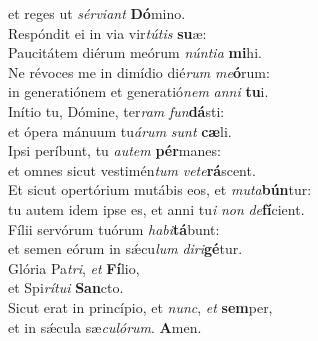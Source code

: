 \oddverse et reges ut \textit{sér}\textit{vi}\textit{ant} \textbf{Dó}mino.\\
\evenverse Respóndit ei in via vir\textit{tú}\textit{tis} \textbf{su}æ:~\*\\
\evenverse Paucitátem diérum meórum \textit{nún}\textit{ti}\textit{a} \textbf{mi}hi.\\
\oddverse Ne révoces me in dimídio dié\textit{rum} \textit{me}\textbf{ó}rum:~\*\\
\oddverse in generatiónem et generatió\textit{nem} \textit{an}\textit{ni} \textbf{tu}i.\\
\evenverse Inítio tu, Dómine, ter\textit{ram} \textit{fun}\textbf{dá}sti:~\*\\
\evenverse et ópera mánuum tu\textit{á}\textit{rum} \textit{sunt} \textbf{cæ}li.\\
\oddverse Ipsi períbunt, tu \textit{au}\textit{tem} \textbf{pér}manes:~\*\\
\oddverse et omnes sicut vestimén\textit{tum} \textit{ve}\textit{te}\textbf{rá}scent.\\
\evenverse Et sicut opertórium mutábis eos, et \textit{mu}\textit{ta}\textbf{bún}tur:~\*\\
\evenverse tu autem idem ipse es, et anni tu\textit{i} \textit{non} \textit{de}\textbf{fí}cient.\\
\oddverse Fílii servórum tuórum \textit{ha}\textit{bi}\textbf{tá}bunt:~\*\\
\oddverse et semen eórum in sǽcu\textit{lum} \textit{di}\textit{ri}\textbf{gé}tur.\\
\evenverse Glória Pa\textit{tri}, \textit{et} \textbf{Fí}lio,~\*\\
\evenverse et Spi\textit{rí}\textit{tu}\textit{i} \textbf{San}cto.\\
\oddverse Sicut erat in princípio, et \textit{nunc}, \textit{et} \textbf{sem}per,~\*\\
\oddverse et in sǽcula sæ\textit{cu}\textit{ló}\textit{rum}. \textbf{A}men.\\
